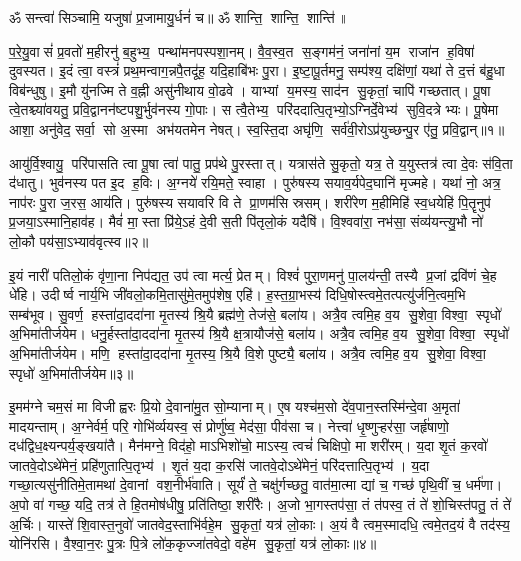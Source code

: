\setcounter{anuvakam}{0}
ॐ सन्त्वा॑ सिञ्चामि॒ यजुषा॑ प्र॒जामायु॒र्धनं॑ च॥ ॐ शान्ति॒ शान्ति॒ शान्ति॑॥

प॒रे॒यु॒वासं॑ प्र॒वतो॑ म॒हीरनु॑ ब॒हुभ्य॒ पन्था॑मनपस्पशा॒नम्। वै॒व॒स्व॒त स॒ङ्गम॑नं॒ जना॑नां य॒म राजा॑न ह॒विषा॑ दुवस्यत। इ॒दं त्वा॒ वस्त्रं॑ प्रथ॒मन्वाग॒न्नपै॒तदू॑ह॒ यदि॒हाबि॑भः पु॒रा। इ॒ष्टा॒पू॒र्तमनु॒ सम्प॑श्य॒ दक्षि॑णां॒ यथा॑ ते द॒त्तं ब॑हु॒धा विब॑न्धुषु। इ॒मौ यु॑नज्मि ते व॒ह्नी असु॑नीथाय वो॒ढवे। याभ्यां य॒मस्य॒ साद॑न सु॒कृतां॒ चापि॑ गच्छतात्। पू॒षा त्वे॒तश्च्या॑वयतु॒ प्रवि॒द्वानन॑ष्टपशु॒र्भुव॑नस्य गो॒पाः। स त्वै॒तेभ्य॒ परि॑ददात्पि॒तृभ्यो॒ऽग्निर्दे॒वेभ्य॑ सुवि॒दत्रेभ्यः। पू॒षेमा आशा॒ अनु॑वेद॒ सर्वा॒ सो अ॒स्मा अभ॑यतमेन नेषत्। स्व॒स्ति॒दा अघृ॑णि॒ सर्व॑वी॒रोऽप्र॑युच्छन्पु॒र ए॑तु॒ प्रवि॒द्वान्॥१॥

आयु॑र्वि॒श्वायु॒ परि॑पासति त्वा पू॒षा त्वा॑ पातु॒ प्रप॑थे पु॒रस्तात्। यत्रास॑ते सु॒कृतो॒ यत्र॒ ते य॒युस्तत्र॑ त्वा दे॒वः स॑वि॒ता द॑धातु। भुव॑नस्य पत इ॒द ह॒विः। अ॒ग्नये॑ रयि॒मते॒ स्वाहा। पुरु॑षस्य सयाव॒र्यपेद॒घानि॑ मृज्महे। यथा॑ नो॒ अत्र॒ नाप॑रः पु॒रा ज॒रस॒ आय॑ति। पुरु॑षस्य सयावरि वि ते प्रा॒णम॑सि स्रसम्। शरी॑रेण म॒हीमिहि॑ स्व॒धयेहि॑ पि॒तॄनुप॑ प्र॒जया॒ऽस्मानि॒हाव॑ह। मैवं॑ मा॒स्ता प्रि॑ये॒ऽहं दे॒वी स॒ती पि॑तृलो॒कं यदैषि॑। वि॒श्ववा॑रा॒ नभ॑सा॒ संव्य॑यन्त्यु॒भौ नो॑ लो॒कौ पय॑सा॒ऽभ्याव॑वृत्स्व॥२॥

इ॒यं नारी॑ पतिलो॒कं वृ॑णा॒ना निप॑द्यत॒ उप॑ त्वा मर्त्य॒ प्रेतम्। विश्वं॑ पुरा॒णमनु॑ पा॒लय॑न्ती॒ तस्यै प्र॒जां द्रवि॑णं चे॒ह धे॑हि। उदीर्ष्व नार्य॒भि जी॑वलो॒कमि॒तासु॑मे॒तमुप॑शेष॒ एहि॑। ह॒स्त॒ग्रा॒भस्य॑ दिधि॒षोस्त्वमे॒तत्पत्यु॑र्जनि॒त्वम॒भि सम्ब॑भूव। सु॒वर्ण॒ हस्ता॑दा॒ददा॑ना मृ॒तस्य॑ श्रि॒यै ब्रह्म॑णे॒ तेज॑से॒ बला॑य। अत्रै॒व त्वमि॒ह व॒य सु॒शेवा॒ विश्वा॒ स्पृधो॑ अ॒भिमा॑तीर्जयेम। धनु॒र्\mbox{}हस्ता॑दा॒ददा॑ना मृ॒तस्य॑ श्रि॒यै क्ष॒त्रायौज॑से॒ बला॑य। अत्रै॒व त्वमि॒ह व॒य सु॒शेवा॒ विश्वा॒ स्पृधो॑ अ॒भिमा॑तीर्जयेम। मणि॒ हस्ता॑दा॒ददा॑ना मृ॒तस्य॒ श्रि॒यै वि॒शे पुष्ट्यै॒ बला॑य। अत्रै॒व त्वमि॒ह व॒य सु॒शेवा॒ विश्वा॒ स्पृधो॑ अ॒भिमा॑तीर्जयेम॥३॥

इ॒मम॑ग्ने चम॒सं मा विजीह्वरः प्रि॒यो दे॒वाना॑मु॒त सो॒म्यानाम्। ए॒ष यश्च॑म॒सो दे॑व॒पान॒स्तस्मि॑न्दे॒वा अ॒मृता॑ मादयन्ताम्। अ॒ग्नेर्वर्म॒ परि॒ गोभि॑र्व्ययस्व॒ सं प्रोर्णु॑ष्व॒ मेद॑सा॒ पीव॑सा च। नेत्त्वा॑ धृ॒ष्णुऱ्\mbox{}हर॑सा॒ जर्\mbox{}हृ॑षाणो॒ दध॑द्विध॒क्ष्यन्पर्य॒ङ्खया॑तै। मैन॑मग्ने॒ विद॑हो॒ माऽभिशो॑चो॒ माऽस्य॒ त्वचं॑ चिक्षिपो॒ मा शरी॑रम्। य॒दा शृ॒तं क॒रवो॑ जातवे॒दोऽथे॑मेनं॒ प्रहि॑णुतात्पि॒तृभ्य॑। शृ॒तं य॒दा क॒रसि॑ जातवे॒दोऽथे॑मेनं॒ परि॑दत्तात्पि॒तृभ्य॑। य॒दा गच्छा॒त्यसु॑नीतिमे॒तामथा॑ दे॒वानां वश॒नीर्भ॑वाति। सूर्यं॑ ते॒ चक्षु॑र्गच्छतु॒ वात॑मा॒त्मा द्यां च॒ गच्छ॑ पृथि॒वीं च॒ धर्म॑णा। अ॒पो वा॑ गच्छ॒ यदि॒ तत्र॑ ते हि॒तमोष॑धीषु॒ प्रति॑तिष्ठा॒ शरी॑रैः। अ॒जो भा॒गस्तप॑सा॒ तं त॑पस्व॒ तं ते॑ शो॒चिस्त॑पतु॒ तं ते॑ अ॒र्चिः। यास्ते॑ शि॒वास्त॒नुवो॑ जातवेद॒स्ताभि॑र्वहे॒म सु॒कृतां॒ यत्र॑ लो॒काः। अ॒यं वै त्वम॒स्मादधि॒ त्वमे॒तद॒यं वै तद॑स्य॒ योनि॑रसि। वै॒श्वा॒न॒रः पु॒त्रः पि॒त्रे लो॑क॒कृज्जा॑तवेदो॒ वहे॑म सु॒कृतां॒ यत्र॑ लो॒काः॥४॥
\anuvakamend[वि॒द्वान॒भ्याव॑वृत्स्वा॒भिमा॑तीर्जयेम॒ शरी॑रैश्च॒त्वारि॑ च]

